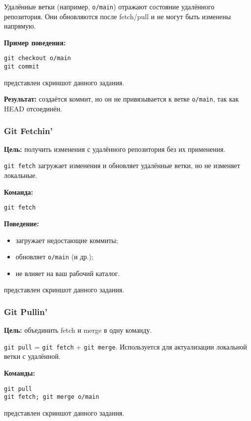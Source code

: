 \documentclass[a4paper,12pt]{report}
\begin{document}
Удалённые ветки (например, \texttt{o/main}) отражают состояние удалённого репозитория. Они обновляются после fetch/pull и не могут быть изменены напрямую.

\textbf{Пример поведения:}
\begin{verbatim}
git checkout o/main
git commit
\end{verbatim}

 представлен скриншот данного задания.

\textbf{Результат:} создаётся коммит, но он не привязывается к ветке \texttt{o/main}, так как HEAD отсоединён.

\subsubsection{Git Fetchin'}
\textbf{Цель:} получить изменения с удалённого репозитория без их применения.

\texttt{git fetch} загружает изменения и обновляет удалённые ветки, но не изменяет локальные.

\textbf{Команда:}
\begin{verbatim}
git fetch
\end{verbatim}

\textbf{Поведение:}
\begin{itemize}[noitemsep]
    \item загружает недостающие коммиты;
    \item обновляет \texttt{o/main} (и др.);
    \item не влияет на ваш рабочий каталог.
\end{itemize}

 представлен скриншот данного задания.

\subsubsection{Git Pullin'}
\textbf{Цель:} объединить fetch и merge в одну команду.

\texttt{git pull} = \texttt{git fetch} + \texttt{git merge}. Используется для актуализации локальной ветки с удалённой.

\textbf{Команды:}
\begin{verbatim}
git pull
git fetch; git merge o/main
\end{verbatim}

 представлен скриншот данного задания.
\end{document}
